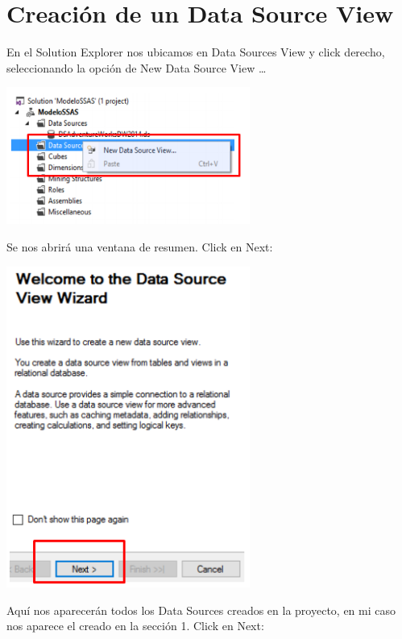 \section{Creación de un Data Source View} 

En el Solution Explorer nos ubicamos en Data Sources View y click derecho, seleccionando la opción de
New Data Source View …
	\begin{center}
	\includegraphics[width=8cm]{images/task2/img9}
	\end{center}	

Se nos abrirá una ventana de resumen. Click en Next:
\begin{center}
	\includegraphics[width=8cm]{images/task2/img10}
\end{center}
Aquí nos aparecerán todos los Data Sources creados en la proyecto, en mi caso nos aparece el creado en
la sección 1. Click en Next:

